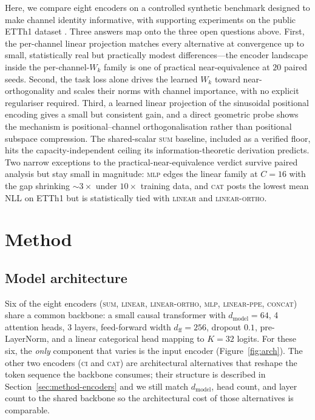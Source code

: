 \documentclass[11pt]{article}
\begin{document}
Here, we compare eight encoders on a controlled synthetic benchmark
designed to make channel identity informative, with supporting
experiments on the public ETTh1 dataset
\citep{zhou2021informer}. Three answers map onto the three open
questions above. First, the per-channel linear projection matches
every alternative at convergence up to small, statistically real
but practically modest differences---the encoder landscape inside
the per-channel-$W_k$ family is one of practical near-equivalence
at $20$ paired seeds. Second, the task loss alone drives the
learned $W_k$ toward near-orthogonality and scales their norms
with channel importance, with no explicit regulariser required.
Third, a learned linear projection of the sinusoidal positional
encoding gives a small but consistent gain, and a direct geometric
probe shows the mechanism is positional--channel orthogonalisation
rather than positional subspace compression. The shared-scalar
\textsc{sum} baseline, included as a verified floor, hits the
capacity-independent ceiling its information-theoretic derivation
predicts. Two narrow exceptions to the practical-near-equivalence
verdict survive paired analysis but stay small in magnitude:
\textsc{mlp} edges the linear family at $C{=}16$ with the gap
shrinking ${\sim}3\times$ under $10\times$ training data, and
\textsc{cat} posts the lowest mean NLL on ETTh1 but is
statistically tied with \textsc{linear} and \textsc{linear-ortho}.

\section{Method}
\label{sec:method}

\subsection{Model architecture}

Six of the eight encoders (\textsc{sum}, \textsc{linear},
\textsc{linear-ortho}, \textsc{mlp}, \textsc{linear-ppe},
\textsc{concat}) share a common backbone: a small causal
transformer with $d_{\text{model}}{=}64$, 4 attention heads, 3
layers, feed-forward width $d_{\text{ff}}{=}256$, dropout $0.1$,
pre-LayerNorm, and a linear categorical head mapping to $K{=}32$
logits. For these six, the \emph{only} component that varies is
the input encoder (Figure~\ref{fig:arch}). The other two encoders
(\textsc{ci} and \textsc{cat}) are architectural alternatives that
reshape the token sequence the backbone consumes; their structure
is described in Section~\ref{sec:method-encoders} and we still
match $d_{\text{model}}$, head count, and layer count to the
shared backbone so the architectural cost of those alternatives is
comparable.
\end{document}
